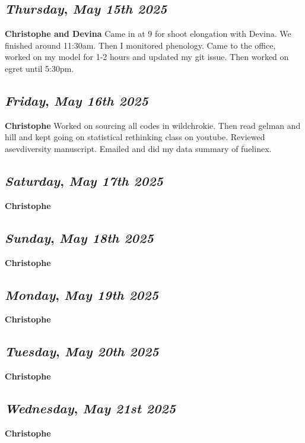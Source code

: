 \def\day{\textit{May 15th 2025}}
\def\weekday{\textit{Thursday}}
\subsection*{\weekday, \day}
\textbf {Christophe and Devina}
Came in at 9 for shoot elongation with Devina. We finished around 11:30am. Then I monitored phenology. Came to the office, worked on my model for 1-2 hours and updated my git issue. Then worked on egret until 5:30pm.

\def\day{\textit{May 16th 2025}}
\def\weekday{\textit{Friday}}
\subsection*{\weekday, \day}
\textbf {Christophe}
Worked on sourcing all codes in wildchrokie. Then read gelman and hill and kept going on statistical rethinking class on youtube. Reviewed asevdiversity manuscript. Emailed and did my data summary of fuelinex.

\def\day{\textit{May 17th 2025}}
\def\weekday{\textit{Saturday}}
\subsection*{\weekday, \day}
\textbf {Christophe}

\def\day{\textit{May 18th 2025}}
\def\weekday{\textit{Sunday}}
\subsection*{\weekday, \day}
\textbf {Christophe}

\def\day{\textit{May 19th 2025}}
\def\weekday{\textit{Monday}}
\subsection*{\weekday, \day}
\textbf {Christophe}

\def\day{\textit{May 20th 2025}}
\def\weekday{\textit{Tuesday}}
\subsection*{\weekday, \day}
\textbf {Christophe}

\def\day{\textit{May 21st 2025}}
\def\weekday{\textit{Wednesday}}
\subsection*{\weekday, \day}
\textbf {Christophe}

